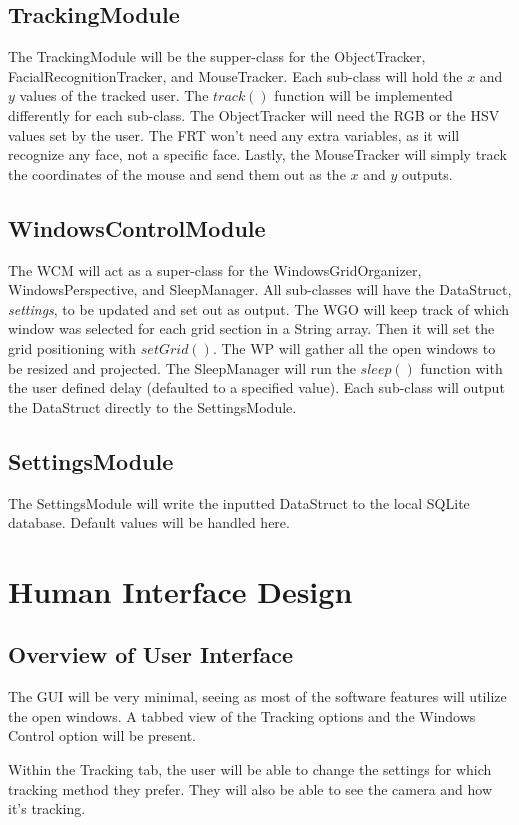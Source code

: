 \documentclass[titlepage]{article}
\begin{document}
\subsection{TrackingModule}
The TrackingModule will be the supper-class for the ObjectTracker, FacialRecognitionTracker, and MouseTracker. Each sub-class will hold the $x$ and $y$ values of the tracked user. The $track()$ function will be implemented differently for each sub-class. The ObjectTracker will need the RGB or the HSV values set by the user. The FRT won't need any extra variables, as it will recognize any face, not a specific face. Lastly, the MouseTracker will simply track the coordinates of the mouse and send them out as the $x$ and $y$ outputs.

\subsection{WindowsControlModule}
The WCM will act as a super-class for the WindowsGridOrganizer, WindowsPerspective, and SleepManager. All sub-classes will have the DataStruct, \textit{settings}, to be updated and set out as output. The WGO will keep track of which window was selected for each grid section in a String array. Then it will set the grid positioning with $setGrid()$. The WP will gather all the open windows to be resized and projected. The SleepManager will run the $sleep()$ function with the user defined delay (defaulted to a specified value). Each sub-class will output the DataStruct directly to the SettingsModule. 

\subsection{SettingsModule}
The SettingsModule will write the inputted DataStruct to the local SQLite database. Default values will be handled here.

\section{Human Interface Design}
\subsection{Overview of User Interface}
The GUI will be very minimal, seeing as most of the software features will utilize the open windows. A tabbed view of the Tracking options and the Windows Control option will be present. 

Within the Tracking tab, the user will be able to change the settings for which tracking method they prefer. They will also be able to see the camera and how it's tracking. 
\end{document}
